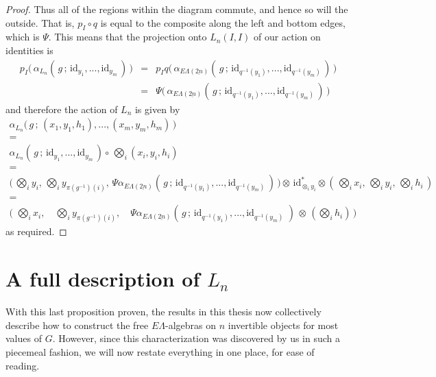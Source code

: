 \documentclass{amsbook} %
\newcommand{\ELnn}{E\Lambda(\underline{2n})}
\numberwithin{section}{chapter}
\begin{document}
\begin{proof}
Thus all of the regions within the diagram commute, and hence so will the outside. That is, $p_I \circ q$ is equal to the composite along the left and bottom edges, which is $\Psi$. This means that the projection onto $L_n(I,I)$ of our action on identities is
\[ \begin{array}{rll}
			p_I \big( \, \alpha_{L_n}( \, g \, ; \, \mathrm{id}_{y_1}, ..., \mathrm{id}_{y_m} \, ) \, \big) & = &  p_I q\big( \, \alpha_{\ELnn}( \, g \, ; \, \mathrm{id}_{q^{-1}(y_1)}, ..., \mathrm{id}_{q^{-1}(y_m)} \, ) \, \big) \\
			& = & \Psi \big( \, \alpha_{\ELnn}( \, g \, ; \, \mathrm{id}_{q^{-1}(y_1)}, ..., \mathrm{id}_{q^{-1}(y_m)} \, ) \, \big)
		\end{array}
\]
and therefore the action of $L_n$ is given by
\[ \begin{array}{c}
			\alpha_{L_n}\big( \, g \, ; \, (x_1, y_1, h_1), ..., (x_m, y_m, h_m) \, \big) \\
			= \\
			\alpha_{L_n}( \, g \, ; \, \mathrm{id}_{y_1}, ..., \mathrm{id}_{y_m} \, ) \circ \, \bigotimes_i (x_i, y_i, h_i) \\
			= \\
			\big( \, \bigotimes_i y_i, \, \bigotimes_i y_{\pi(g^{-1})(i)}, \, \Psi \alpha_{\ELnn}( \, g \, ; \, \mathrm{id}_{q^{-1}(y_1)}, ..., \mathrm{id}_{q^{-1}(y_m)} \, ) \, \big) \otimes \, \mathrm{id}_{\otimes_i y_i}^* \otimes ( \, \bigotimes_i x_i, \, \bigotimes_i y_i, \, \bigotimes_i h_i \, ) \\
			= \\
			\big( \, \, \bigotimes_i x_i, \quad \bigotimes_i y_{\pi(g^{-1})(i)}, \quad \Psi \alpha_{\ELnn}( \, g \, ; \, \mathrm{id}_{q^{-1}(y_1)}, ..., \mathrm{id}_{q^{-1}(y_m)} \, \, ) \, \otimes \, (\bigotimes_i h_i) \, \big) 
		\end{array}
\]
as required.
\end{proof}

\section{A full description of \texorpdfstring{$L_n$}{L_n}}

With this last proposition proven, the results in this thesis now collectively describe how to construct the free $E\Lambda$-algebras on $n$ invertible objects for most values of $G$. However, since this characterization was discovered by us in such a piecemeal fashion, we will now restate everything in one place, for ease of reading. 
\end{document}
